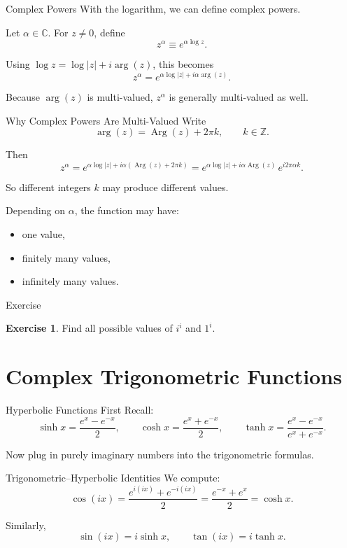 \documentclass[11pt]{beamer}
\theoremstyle{definition}
\newtheorem{exercise}{Exercise}[section]
\theoremstyle{plain}
\newcommand{\C}{\mathbb{C}}
\newcommand{\Arg}{\operatorname{Arg}}
\begin{document}
\begin{frame}{Complex Powers}
With the logarithm, we can define complex powers.

Let \(\alpha\in\C\). For \(z\neq 0\), define
\[
z^\alpha \equiv e^{\alpha \log z}.
\]

Using \(\log z=\log|z|+i\arg(z)\), this becomes
\[
z^\alpha = e^{\alpha \log|z|+i\alpha \arg(z)}.
\]

Because \(\arg(z)\) is multi-valued, \(z^\alpha\) is generally multi-valued as well.
\end{frame}

\begin{frame}{Why Complex Powers Are Multi-Valued}
Write
\[
\arg(z)=\Arg(z)+2\pi k,\qquad k\in\mathbb Z.
\]

Then
\[
z^\alpha
= e^{\alpha \log|z|+i\alpha(\Arg(z)+2\pi k)}
= e^{\alpha \log|z|+i\alpha\Arg(z)}\,e^{i2\pi\alpha k}.
\]

So different integers \(k\) may produce different values.

Depending on \(\alpha\), the function may have:
\begin{itemize}
    \item one value,
    \item finitely many values,
    \item infinitely many values.
\end{itemize}
\end{frame}

\begin{frame}{Exercise}
\begin{exercise}
Find all possible values of \(i^i\) and \(1^i\).
\end{exercise}
\end{frame}

\section{Complex Trigonometric Functions}

\begin{frame}{Hyperbolic Functions First}
Recall:
\[
\sinh x=\frac{e^x-e^{-x}}{2},
\qquad
\cosh x=\frac{e^x+e^{-x}}{2},
\qquad
\tanh x=\frac{e^x-e^{-x}}{e^x+e^{-x}}.
\]

Now plug in purely imaginary numbers into the trigonometric formulas.
\end{frame}

\begin{frame}{Trigonometric--Hyperbolic Identities}
We compute:
\[
\cos(ix)=\frac{e^{i(ix)}+e^{-i(ix)}}{2}
=\frac{e^{-x}+e^x}{2}
=\cosh x.
\]

Similarly,
\[
\sin(ix)=i\sinh x,
\qquad
\tan(ix)=i\tanh x.
\]
\end{frame}
\end{document}
